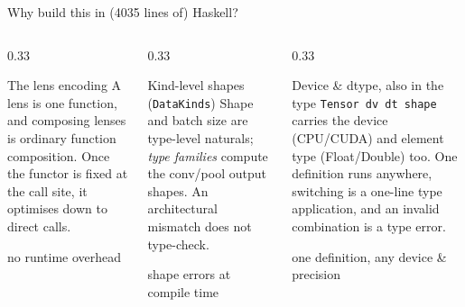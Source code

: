 \documentclass[aspectratio=169,11pt]{beamer}
\begin{document}
\begin{frame}{Why build this in (4035 lines of) Haskell?}
  \begin{columns}[T]
    \begin{column}{0.33\textwidth}
      \begin{block}{\small The lens encoding}
        \footnotesize A lens is one function, and composing lenses is ordinary function
        composition. Once the functor is fixed at the call site, it optimises down to direct calls.
      \end{block}
      \begin{center}\footnotesize\color{imperiallight}no runtime overhead\end{center}
    \end{column}
    \begin{column}{0.33\textwidth}
      \begin{block}{\small Kind-level shapes (\texttt{DataKinds})}
        \footnotesize Shape and batch size are type-level naturals; \emph{type families} compute the
        conv/pool output shapes. An architectural mismatch does not type-check.
      \end{block}
      \begin{center}\footnotesize\color{imperiallight}shape errors at compile time\end{center}
    \end{column}
    \begin{column}{0.33\textwidth}
      \begin{block}{\small Device \& dtype, also in the type}
        \footnotesize \texttt{Tensor dv dt shape} carries the device (CPU/CUDA) and element type
        (Float/Double) too. One definition runs anywhere, switching is a one-line type application,
        and an invalid combination is a type error.
      \end{block}
      \begin{center}\footnotesize\color{imperiallight}one definition, any device \& precision\end{center}
    \end{column}
  \end{columns}
\end{frame}
\end{document}

